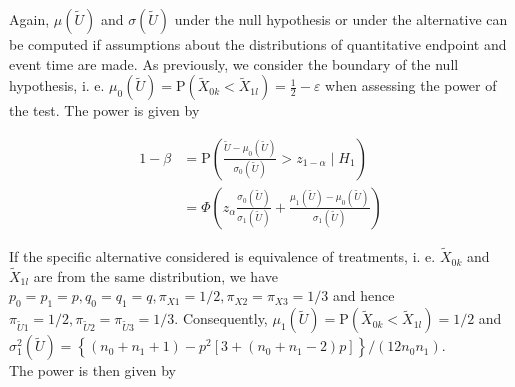\documentclass[bimj,fleqn]{w-art}\usepackage[]{graphicx}\usepackage[]{color}
\theoremstyle{plain}
\theoremstyle{definition}
\begin{document}
  Again, $\mu(\widetilde{U})$ and $\sigma(\widetilde{U})$ under the null
  hypothesis or under the alternative can be computed if assumptions about the
  distributions of quantitative endpoint and event time are made. As previously, we
	consider the boundary of the null hypothesis, i. e.
  $\mu_0(\widetilde{U}) = \text{P}(\widetilde{X}_{0k} <
  \widetilde{X}_{1l}) = \frac{1}{2} - \varepsilon$ when assessing the power of
  the test. The power is given by

  \begin{align*}
    1 - \beta &= \text{P} \left(\frac{\widetilde{U} - \mu_0(\widetilde{U})}{\sigma_0(\widetilde{U})}  >
                                   z_{1-\alpha} \mid H_1 \right) \\
              &= \Phi\left(z_{\alpha}\frac{\sigma_0(\widetilde{U})}{\sigma_1(\widetilde{U})} +
                              \frac{\mu_1(\widetilde{U}) - \mu_0(\widetilde{U})}{\sigma_1(\widetilde{U})} \right)
  \end{align*}

  If the specific alternative considered is equivalence of treatments, i. e.
  $\widetilde{X}_{0k}$ and $\widetilde{X}_{1l}$ are from the same distribution,
  we have $p_0 = p_1 = p, q_0 = q_1 = q, \pi_{X1} = 1/2,
  \pi_{X2} = \pi_{X3} = 1/3$ and hence
  $\pi_{\widetilde{U}1} = 1/2, \pi_{\widetilde{U}2} = \pi_{\widetilde{U}3} = 1/3 $.
  Consequently, $\mu_1(\widetilde{U}) = \text{P}(\widetilde{X}_{0k} < \widetilde{X}_{1l}) = 1/2$
  and \\
  $\sigma^2_1(\widetilde{U}) = \left\{ (n_0 + n_1 +1) -
                p^2 \left[ 3 +(n_0 + n_1 -2) p \right] \right\} / (12 n_0 n_1)$.\\
The power is then given by
\end{document}
